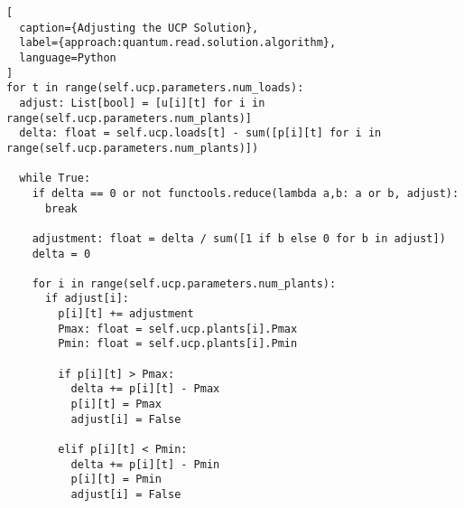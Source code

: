 \begin{lstlisting}[
  caption={Adjusting the UCP Solution},
  label={approach:quantum.read.solution.algorithm},
  language=Python
]
for t in range(self.ucp.parameters.num_loads):
  adjust: List[bool] = [u[i][t] for i in range(self.ucp.parameters.num_plants)]
  delta: float = self.ucp.loads[t] - sum([p[i][t] for i in range(self.ucp.parameters.num_plants)])

  while True:
    if delta == 0 or not functools.reduce(lambda a,b: a or b, adjust):
      break

    adjustment: float = delta / sum([1 if b else 0 for b in adjust])
    delta = 0

    for i in range(self.ucp.parameters.num_plants):
      if adjust[i]:
        p[i][t] += adjustment
        Pmax: float = self.ucp.plants[i].Pmax
        Pmin: float = self.ucp.plants[i].Pmin

        if p[i][t] > Pmax:
          delta += p[i][t] - Pmax
          p[i][t] = Pmax
          adjust[i] = False

        elif p[i][t] < Pmin:
          delta += p[i][t] - Pmin
          p[i][t] = Pmin
          adjust[i] = False
\end{lstlisting}
